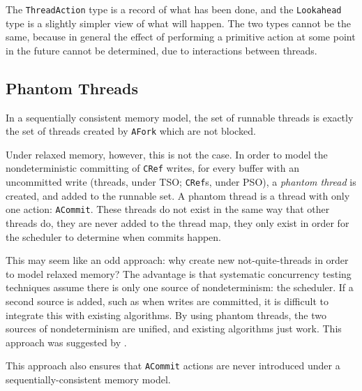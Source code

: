 The \verb|ThreadAction| type is a record of what has been done, and
the \verb|Lookahead| type is a slightly simpler view of what will
happen. The two types cannot be the same, because in general the
effect of performing a primitive action at some point in the future
cannot be determined, due to interactions between threads.

\subsection{Phantom Threads}
\label{sec:execution-scheduling-phantom}

In a sequentially consistent memory model, the set of runnable threads
is exactly the set of threads created by \verb|AFork| which are not
blocked.

Under relaxed memory, however, this is not the case. In order to model
the nondeterministic committing of \verb|CRef| writes, for every
buffer with an uncommitted write (threads, under TSO; \verb|CRef|s,
under PSO), a \emph{phantom thread} is created, and added to the
runnable set. A phantom thread is a thread with only one action:
\verb|ACommit|. These threads do not exist in the same way that other
threads do, they are never added to the thread map, they only exist in
order for the scheduler to determine when commits happen.

This may seem like an odd approach: why create new not-quite-threads
in order to model relaxed memory? The advantage is that systematic
concurrency testing techniques assume there is only one source of
nondeterminism: the scheduler. If a second source is added, such as
when writes are committed, it is difficult to integrate this with
existing algorithms. By using phantom threads, the two sources of
nondeterminism are unified, and existing algorithms just work. This
approach was suggested by \citep{rdpor}.

This approach also ensures that \verb|ACommit| actions are never
introduced under a sequentially-consistent memory model.
